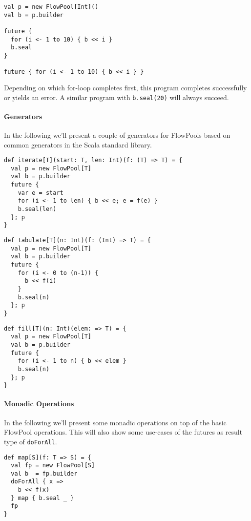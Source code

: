 \documentclass[runningheads,a4paper]{llncs}
\begin{document}
\begin{verbatim}
val p = new FlowPool[Int]()
val b = p.builder

future {
  for (i <- 1 to 10) { b << i }
  b.seal
}

future { for (i <- 1 to 10) { b << i } }
\end{verbatim}

Depending on which for-loop completes first, this program completes
successfully or yields an error. A similar program with
\verb+b.seal(20)+ will always succeed.

\paragraph{Generators} In the following we'll present a couple of
generators for FlowPools based on common generators in the Scala
standard library.

\begin{verbatim}
def iterate[T](start: T, len: Int)(f: (T) => T) = {
  val p = new FlowPool[T]
  val b = p.builder
  future {
    var e = start
    for (i <- 1 to len) { b << e; e = f(e) }
    b.seal(len)
  }; p
}
\end{verbatim}

\begin{verbatim}
def tabulate[T](n: Int)(f: (Int) => T) = {
  val p = new FlowPool[T]
  val b = p.builder
  future {
    for (i <- 0 to (n-1)) {
      b << f(i)
    }
    b.seal(n)
  }; p
}
\end{verbatim}

\begin{verbatim}
def fill[T](n: Int)(elem: => T) = {
  val p = new FlowPool[T]
  val b = p.builder
  future {
    for (i <- 1 to n) { b << elem }
    b.seal(n)
  }; p
}
\end{verbatim}

\paragraph{Monadic Operations} In the following we'll present some
monadic operations on top of the basic FlowPool operations. This will
also show some use-cases of the futures as result type of
\verb+doForAll+.

\begin{verbatim}
def map[S](f: T => S) = {
  val fp = new FlowPool[S]
  val b  = fp.builder
  doForAll { x =>
    b << f(x)
  } map { b.seal _ }
  fp
}
\end{verbatim}
\end{document}
